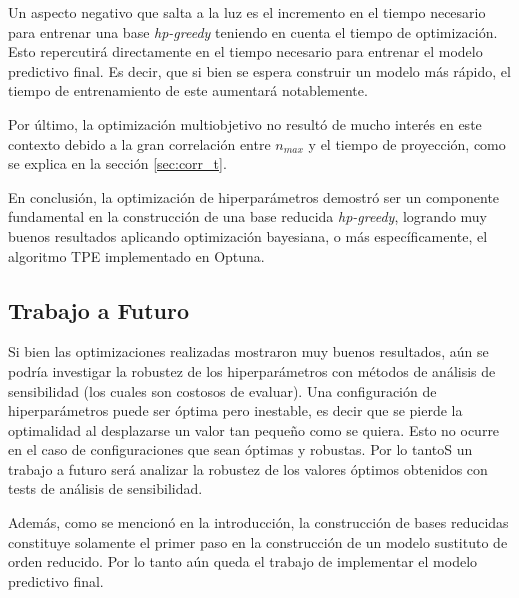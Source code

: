 Un aspecto negativo que salta a la luz es el incremento en el tiempo necesario para entrenar una base \textit{hp-greedy} teniendo en cuenta el tiempo de optimización. Esto repercutirá directamente en el tiempo necesario para entrenar el modelo predictivo final. Es decir, que si bien se espera construir un modelo más rápido, el tiempo de entrenamiento de este aumentará notablemente.

Por último, la optimización multiobjetivo no resultó de mucho interés en este contexto debido a la gran correlación entre $n_{max}$ y el tiempo de proyección, como se explica en la sección \ref{sec:corr_t}.


En conclusión, la optimización de hiperparámetros demostró ser un componente fundamental en la construcción de una base reducida \textit{hp-greedy}, logrando muy buenos resultados aplicando optimización bayesiana, o más específicamente, el algoritmo TPE implementado en Optuna.

\subsection*{Trabajo a Futuro}

Si bien las optimizaciones realizadas mostraron muy buenos resultados, aún se podría investigar la robustez de los hiperparámetros con métodos de análisis de sensibilidad (los cuales son costosos de evaluar). 
Una configuración de hiperparámetros puede ser óptima pero inestable, es decir que se pierde la optimalidad al desplazarse un valor tan pequeño como se quiera. Esto no ocurre en el caso de configuraciones que sean óptimas y robustas. Por lo tantoS un trabajo a futuro será analizar la robustez de los valores óptimos obtenidos con tests de análisis de sensibilidad.


Además, como se mencionó en la introducción, la construcción de bases reducidas constituye solamente el primer paso en la construcción de un modelo sustituto de orden reducido. Por lo tanto aún queda el trabajo de implementar el modelo predictivo final.



